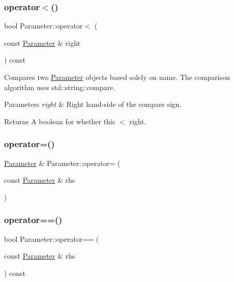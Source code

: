 \subsubsection{\texorpdfstring{operator$<$()}{operator<()}}
{\footnotesize\ttfamily bool Parameter\+::operator$<$ (\begin{DoxyParamCaption}\item[{const \mbox{\hyperlink{classanen_par_1_1_parameter}{Parameter}} \&}]{right }\end{DoxyParamCaption}) const}

Compares two \mbox{\hyperlink{classanen_par_1_1_parameter}{Parameter}} objects based solely on name. The comparison algorithm uses std\+::string\+::compare.


\begin{DoxyParams}{Parameters}
{\em right} & Right hand-\/side of the compare sign. \\
\hline
\end{DoxyParams}
\begin{DoxyReturn}{Returns}
A boolean for whether this $<$ right. 
\end{DoxyReturn}
\mbox{\label{classanen_par_1_1_parameter_a3bd55c637ccb3891e09cfa4a6bec91f5}} 
\subsubsection{\texorpdfstring{operator=()}{operator=()}}
{\footnotesize\ttfamily \mbox{\hyperlink{classanen_par_1_1_parameter}{Parameter}} \& Parameter\+::operator= (\begin{DoxyParamCaption}\item[{const \mbox{\hyperlink{classanen_par_1_1_parameter}{Parameter}} \&}]{rhs }\end{DoxyParamCaption})}

\mbox{\label{classanen_par_1_1_parameter_ada4106ab9962e61d1aecf5bf032290c3}} 
\subsubsection{\texorpdfstring{operator==()}{operator==()}}
{\footnotesize\ttfamily bool Parameter\+::operator== (\begin{DoxyParamCaption}\item[{const \mbox{\hyperlink{classanen_par_1_1_parameter}{Parameter}} \&}]{rhs }\end{DoxyParamCaption}) const}

